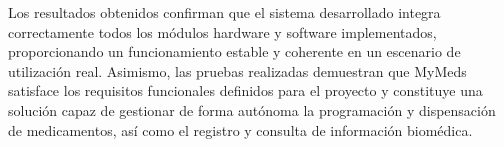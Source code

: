 Los resultados obtenidos confirman que el sistema desarrollado integra correctamente todos los módulos hardware y software implementados, proporcionando un funcionamiento estable y coherente en un escenario de utilización real. Asimismo, las pruebas realizadas demuestran que MyMeds satisface los requisitos funcionales definidos para el proyecto y constituye una solución capaz de gestionar de forma autónoma la programación y dispensación de medicamentos, así como el registro y consulta de información biomédica.


